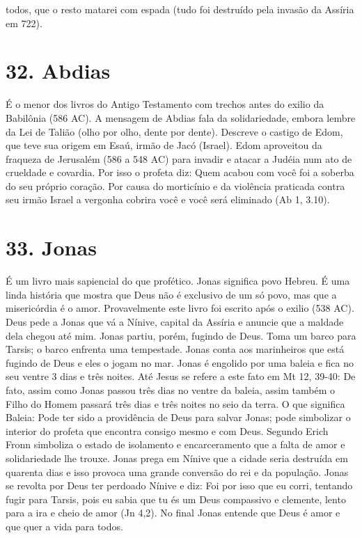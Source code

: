 \documentclass[
]{book}
\begin{document}
todos, que o resto matarei com espada (tudo foi destruído pela invasão da Assíria em 722).

\hypertarget{abdias}{%
\section*{32. Abdias}\label{abdias}}

É o menor dos livros do Antigo Testamento com trechos antes do exilio da Babilônia (586 AC). A mensagem de Abdias fala da solidariedade, embora lembre da Lei de Talião (olho por olho, dente por dente). Descreve o castigo de Edom, que teve sua origem em Esaú, irmão de Jacó (Israel). Edom aproveitou da fraqueza de Jerusalém (586 a 548 AC) para invadir e atacar a Judéia num ato de crueldade e covardia. Por isso o profeta diz: Quem acabou com você foi a soberba do seu próprio coração. Por causa do morticínio e da violência praticada contra seu irmão Israel a vergonha cobrira você e você será eliminado (Ab 1, 3.10).

\hypertarget{jonas}{%
\section*{33. Jonas}\label{jonas}}

É um livro mais sapiencial do que profético. Jonas significa povo Hebreu. É uma linda história que mostra que Deus não é exclusivo de um só povo, mas que a misericórdia é o amor. Provavelmente este livro foi escrito após o exilio (538 AC). Deus pede a Jonas que vá a Nínive, capital da Assíria e anuncie que a maldade dela chegou até mim. Jonas partiu, porém, fugindo de Deus. Toma um barco para Tarsis; o barco enfrenta uma tempestade. Jonas conta aos marinheiros que está fugindo de Deus e eles o jogam no mar. Jonas é engolido por uma baleia e fica no seu ventre 3 dias e três noites. Até Jesus se refere a este fato em Mt 12, 39-40: De fato, assim como Jonas passou três dias no ventre da baleia, assim também o Filho do Homem passará três dias e três noites no seio da terra. O que significa Baleia: Pode ter sido a providência de Deus para salvar Jonas; pode simbolizar o interior do profeta que encontra consigo mesmo e com Deus. Segundo Erich Fronn simboliza o estado de isolamento e encarceramento que a falta de amor e solidariedade lhe trouxe. Jonas prega em Nínive que a cidade seria destruída em quarenta dias e isso provoca uma grande conversão do rei e da população. Jonas se revolta por Deus ter perdoado Nínive e diz: Foi por isso que eu corri, tentando fugir para Tarsis, pois eu sabia que tu és um Deus compassivo e clemente, lento para a ira e cheio de amor (Jn 4,2). No final Jonas entende que Deus é amor e que quer a vida para todos.
\end{document}
